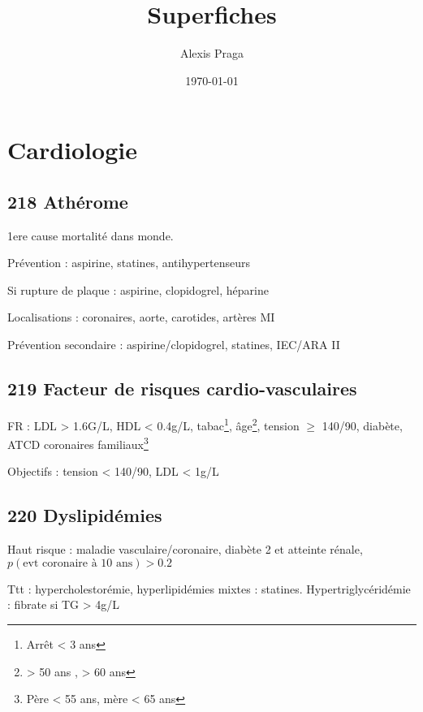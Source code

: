 \documentclass[11pt]{article}
\author{Alexis Praga}
\date{\today}
\title{Superfiches}
\begin{document}
\maketitle
\tableofcontents

\section{Cardiologie}
\label{sec:org13b2d0c}
\subsection{218 Athérome}
\label{sec:org5a6b9bb}
1ere cause mortalité dans monde.

Prévention : aspirine, statines, antihypertenseurs

Si rupture de plaque : aspirine, clopidogrel, héparine 

Localisations : coronaires, aorte, carotides, artères MI

Prévention secondaire : aspirine/clopidogrel, statines, IEC/ARA II

\subsection{219 Facteur de risques cardio-vasculaires}
\label{sec:orgda2c634}
FR : LDL > 1.6G/L, HDL < 0.4g/L, tabac\footnote{Arrêt < 3 ans}, âge\footnote{> 50 ans \male{}, > 60 ans \female{}}, tension \(\ge\) 140/90, diabète, ATCD
coronaires familiaux\footnote{Père < 55 ans, mère < 65 ans}

Objectifs : tension < 140/90, LDL < 1g/L
\subsection{220 Dyslipidémies}
\label{sec:orgb72c816}
Haut risque : maladie vasculaire/coronaire, diabète 2 et atteinte rénale,
\(p(\text{evt coronaire à 10 ans}) > 0.2\)

Ttt : hypercholestorémie, hyperlipidémies mixtes : statines. Hypertriglycéridémie : fibrate si TG > 4g/L
\end{document}

